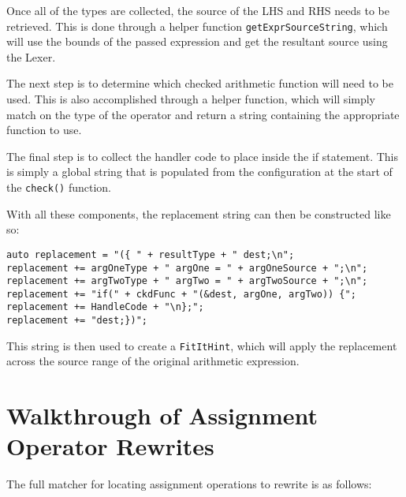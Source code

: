 Once all of the types are collected, the source of the LHS and RHS needs to be retrieved. This is done through a helper function \texttt{getExprSourceString}, which will use the bounds of the passed expression and get the resultant source using the Lexer.

The next step is to determine which checked arithmetic function will need to be used. This is also accomplished through a helper function, which will simply match on the type of the operator and return a string containing the appropriate function to use.

The final step is to collect the handler code to place inside the if statement. This is simply a global string that is populated from the configuration at the start of the \texttt{check()} function.

With all these components, the replacement string can then be constructed like so:
\begin{center}
\parbox{0.99\linewidth}{
\texttt{auto replacement = "(\{ " + resultType + " dest;\textbackslash n";\\
replacement += argOneType + " argOne = " + argOneSource + ";\textbackslash n";\\
replacement += argTwoType + " argTwo = " + argTwoSource + ";\textbackslash n";\\
replacement += "if(" + ckdFunc + "(\&dest, argOne, argTwo)) \{";\\
replacement += HandleCode + "\textbackslash n\};";\\
replacement += "dest;\})";}
}
\end{center}

This string is then used to create a \texttt{FitItHint}, which will apply the replacement across the source range of the original arithmetic expression.

\section{Walkthrough of Assignment Operator Rewrites}

The full matcher for locating assignment operations to rewrite is as follows:

